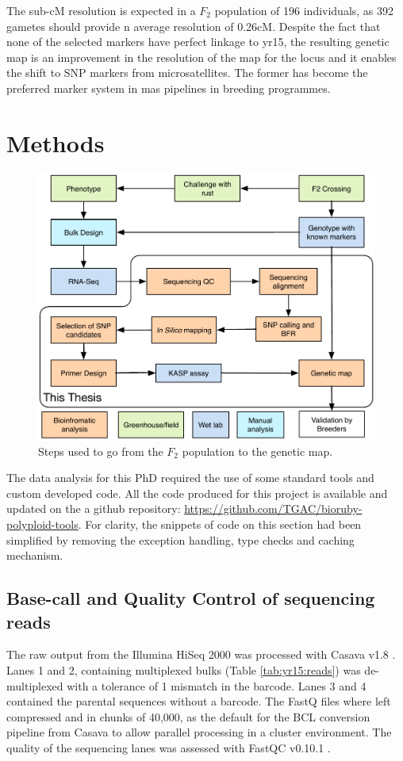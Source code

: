 The sub-cM resolution is expected in a $F_{2}$ population of 196 individuals, as 392 gametes should provide n average resolution of 0.26cM. 
Despite the fact that none of the selected markers have perfect linkage to \gls{yr15}, the resulting genetic map is an improvement in the resolution of the map for the locus and it enables the shift to SNP markers from microsatellites. The former has become the preferred marker system in \gls{mas} pipelines in breeding programmes. 


\section{Methods}
\label{yr15:methods}

\begin{figure}
\includegraphics[width=1\textwidth]{Yr15/Figures/pipeline.pdf}
\caption{Steps used to go from the $F_{2}$ population to the genetic map.}
\end{figure}

The data analysis for this PhD required the use of some standard tools and custom developed code. 
All the code produced for this project is available and updated on the a github repository: \url{https://github.com/TGAC/bioruby-polyploid-tools}. 
For clarity, the snippets of code on this section had been simplified by removing the exception handling, type checks and caching mechanism.

\subsection{Base-call and Quality Control of sequencing reads}
The raw output from the Illumina HiSeq 2000 was processed with Casava v1.8 \citep{casavaBCL}. 
Lanes 1 and 2, containing multiplexed bulks (Table \ref{tab:yr15:reads}) was de-multiplexed with a tolerance of 1 mismatch in the barcode. 
Lanes 3 and 4 contained the parental sequences without a barcode. 
The FastQ files where left compressed and in chunks of 40,000, as the default for the BCL conversion pipeline from Casava to allow parallel processing in a cluster environment. 
The quality of the sequencing lanes was assessed with FastQC v0.10.1 \citep{fastqc}. 


